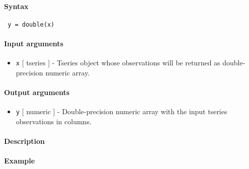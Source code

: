 


	\paragraph{Syntax}
 
 \begin{verbatim}
 y = double(x)
 \end{verbatim}
 
 \paragraph{Input arguments}
 
 \begin{itemize}
 \item
   \texttt{x} {[} tseries {]} - Tseries object whose observations will be
   returned as double-precision numeric array.
 \end{itemize}
 
 \paragraph{Output arguments}
 
 \begin{itemize}
 \item
   \texttt{y} {[} numeric {]} - Double-precision numeric array with the
   input tseries observations in columns.
 \end{itemize}
 
 \paragraph{Description}
 
 \paragraph{Example}


